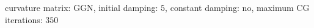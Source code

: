curvature matrix: $\text{GGN}$, initial damping: $\num[scientific-notation=false]{5}$, constant damping: $\text{no}$, maximum CG iterations: $\num[scientific-notation=false]{350}$